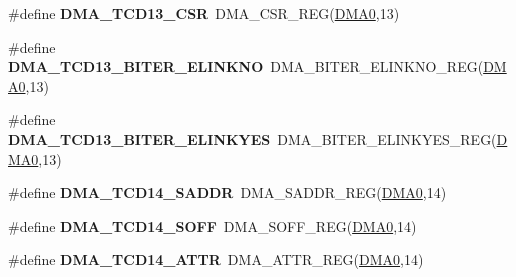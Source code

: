 \begin{DoxyCompactItemize}
\item 
\#define {\bfseries D\+M\+A\+\_\+\+T\+C\+D13\+\_\+\+C\+SR}~D\+M\+A\+\_\+\+C\+S\+R\+\_\+\+R\+EG(\hyperlink{group__DMA__Peripheral__Access__Layer_ga4103044f9ca209772f513dc694513ffb}{D\+M\+A0},13)\hypertarget{group__DMA__Register__Accessor__Macros_ga57278ea64ab9f974531a4ee3c57797c6}{}\label{group__DMA__Register__Accessor__Macros_ga57278ea64ab9f974531a4ee3c57797c6}

\item 
\#define {\bfseries D\+M\+A\+\_\+\+T\+C\+D13\+\_\+\+B\+I\+T\+E\+R\+\_\+\+E\+L\+I\+N\+K\+NO}~D\+M\+A\+\_\+\+B\+I\+T\+E\+R\+\_\+\+E\+L\+I\+N\+K\+N\+O\+\_\+\+R\+EG(\hyperlink{group__DMA__Peripheral__Access__Layer_ga4103044f9ca209772f513dc694513ffb}{D\+M\+A0},13)\hypertarget{group__DMA__Register__Accessor__Macros_gaf8d3d5de90640cb72376b1a659fa622b}{}\label{group__DMA__Register__Accessor__Macros_gaf8d3d5de90640cb72376b1a659fa622b}

\item 
\#define {\bfseries D\+M\+A\+\_\+\+T\+C\+D13\+\_\+\+B\+I\+T\+E\+R\+\_\+\+E\+L\+I\+N\+K\+Y\+ES}~D\+M\+A\+\_\+\+B\+I\+T\+E\+R\+\_\+\+E\+L\+I\+N\+K\+Y\+E\+S\+\_\+\+R\+EG(\hyperlink{group__DMA__Peripheral__Access__Layer_ga4103044f9ca209772f513dc694513ffb}{D\+M\+A0},13)\hypertarget{group__DMA__Register__Accessor__Macros_gac91e49de86dc4e5b073510648adce3b3}{}\label{group__DMA__Register__Accessor__Macros_gac91e49de86dc4e5b073510648adce3b3}

\item 
\#define {\bfseries D\+M\+A\+\_\+\+T\+C\+D14\+\_\+\+S\+A\+D\+DR}~D\+M\+A\+\_\+\+S\+A\+D\+D\+R\+\_\+\+R\+EG(\hyperlink{group__DMA__Peripheral__Access__Layer_ga4103044f9ca209772f513dc694513ffb}{D\+M\+A0},14)\hypertarget{group__DMA__Register__Accessor__Macros_ga3ef5e2430d4e4dab34edc5e8767d0e46}{}\label{group__DMA__Register__Accessor__Macros_ga3ef5e2430d4e4dab34edc5e8767d0e46}

\item 
\#define {\bfseries D\+M\+A\+\_\+\+T\+C\+D14\+\_\+\+S\+O\+FF}~D\+M\+A\+\_\+\+S\+O\+F\+F\+\_\+\+R\+EG(\hyperlink{group__DMA__Peripheral__Access__Layer_ga4103044f9ca209772f513dc694513ffb}{D\+M\+A0},14)\hypertarget{group__DMA__Register__Accessor__Macros_gaddb2f2f5de001a3b004aa70b37435628}{}\label{group__DMA__Register__Accessor__Macros_gaddb2f2f5de001a3b004aa70b37435628}

\item 
\#define {\bfseries D\+M\+A\+\_\+\+T\+C\+D14\+\_\+\+A\+T\+TR}~D\+M\+A\+\_\+\+A\+T\+T\+R\+\_\+\+R\+EG(\hyperlink{group__DMA__Peripheral__Access__Layer_ga4103044f9ca209772f513dc694513ffb}{D\+M\+A0},14)\hypertarget{group__DMA__Register__Accessor__Macros_ga28f6a5c3e58f81c56650128d0d384d17}{}\label{group__DMA__Register__Accessor__Macros_ga28f6a5c3e58f81c56650128d0d384d17}


\end{DoxyCompactItemize}
